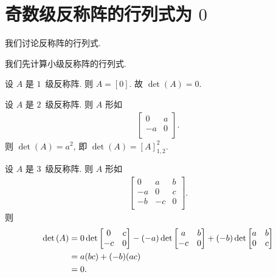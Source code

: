 \documentclass[../libro.tex]{subfiles}
\begin{document}
\section{\texorpdfstring{奇数级反称阵的行列式为 \(0\)}%
{奇数级反称阵的行列式为 0}}

我们讨论反称阵的行列式.

我们先计算小级反称阵的行列式.

\begin{example}
    设 \(A\) 是 \(1\)~级反称阵.
    则 \(A = [0]\).
    故 \(\det {(A)} = 0\).
\end{example}

\begin{example}
    设 \(A\) 是 \(2\)~级反称阵.
    则 \(A\) 形如
    \begin{align*}
        \begin{bmatrix}
            0  & a \\
            -a & 0 \\
        \end{bmatrix}.
    \end{align*}
    则 \(\det {(A)} = a^2\),
    即 \(\det {(A)} = [A]_{1,2}^2\).
\end{example}

\begin{example}
    设 \(A\) 是 \(3\)~级反称阵.
    则 \(A\) 形如
    \begin{align*}
        \begin{bmatrix}
            0  & a  & b \\
            -a & 0  & c \\
            -b & -c & 0 \\
        \end{bmatrix}.
    \end{align*}
    则
    \begin{align*}
        \det {(A)}
        = {} &
        0 \det {
            \begin{bmatrix}
                0  & c \\
                -c & 0 \\
            \end{bmatrix}
        }
        - (-a) \det {
            \begin{bmatrix}
                a  & b \\
                -c & 0 \\
            \end{bmatrix}
        }
        + (-b) \det {
            \begin{bmatrix}
                a & b \\
                0 & c \\
            \end{bmatrix}
        }
        \\
        = {} &
        a(bc) + (-b)(ac)
        \\
        = {} & 0.
        \qedhere
    \end{align*}
\end{example}
\end{document}
